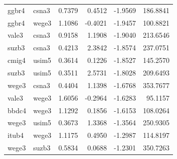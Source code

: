 \begin{tabular}{llrrrr}
ggbr4 & csna3 & 0.7379 & 0.4512 & -1.9569 & 186.8841\\
\addlinespace
ggbr4 & wege3 & 1.1086 & -0.4021 & -1.9457 & 100.8821\\
vale3 & csna3 & 0.9158 & 1.1908 & -1.9040 & 213.6546\\
suzb3 & csna3 & 0.4213 & 2.3842 & -1.8574 & 237.0751\\
cmig4 & usim5 & 0.3614 & 0.1226 & -1.8527 & 145.2570\\
suzb3 & usim5 & 0.3511 & 2.5731 & -1.8028 & 209.6493\\
\addlinespace
wege3 & csna3 & 0.4404 & 1.1398 & -1.6768 & 353.7677\\
vale3 & wege3 & 1.6056 & -0.2964 & -1.6283 & 95.1157\\
bbdc4 & wege3 & 1.1292 & 0.1856 & -1.6153 & 108.0264\\
wege3 & usim5 & 0.3673 & 1.3368 & -1.3564 & 250.9305\\
itub4 & wege3 & 1.1175 & 0.4950 & -1.2987 & 114.8197\\
\addlinespace
wege3 & suzb3 & 0.5834 & 0.0688 & -1.2301 & 350.7263\\
\bottomrule
\end{tabular}
